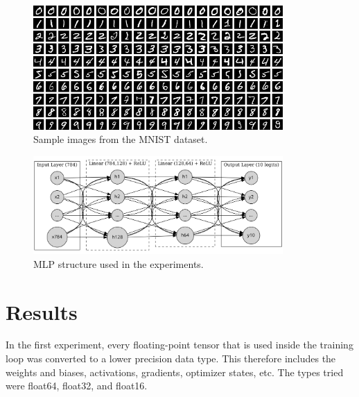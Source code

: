 \documentclass[11pt]{article}
\begin{document}
\begin{figure}[H]
	\centering
	\includegraphics[width=0.85\textwidth]{figures/mnist.png}
	\caption{Sample images from the MNIST dataset.}\label{fig:mnistSample}
\end{figure}

\begin{figure}[H]
	\centering
	\includegraphics[width=0.85\textwidth]{figures/mlpStruc.png}
	\caption{MLP structure used in the experiments.}\label{fig:mlpStructure}
\end{figure}

\section{Results}
In the first experiment, every floating-point tensor that is used inside the
training loop was converted to a lower precision data type. This therefore
includes the weights and biases, activations, gradients, optimizer states, etc.
The types tried were float64, float32, and float16.
\end{document}
